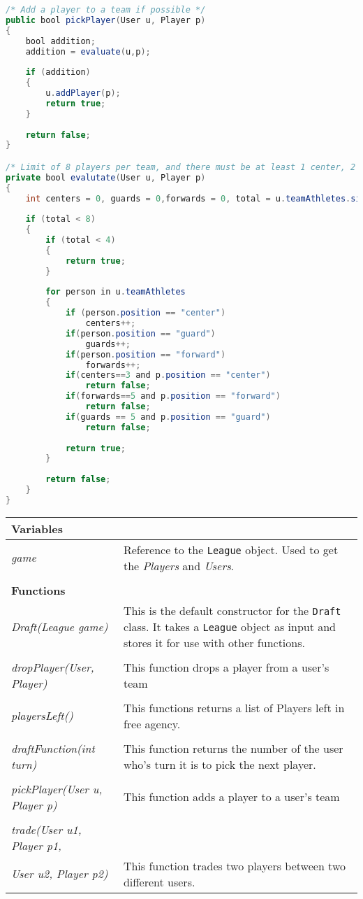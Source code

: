 \documentclass[12pt]{report}
\begin{document}
\begin{lstlisting}[language=Java,label=some-code,caption=Picking a Player]
/* Add a player to a team if possible */
public bool pickPlayer(User u, Player p)
{
	bool addition;
	addition = evaluate(u,p);
	
	if (addition)
	{
		u.addPlayer(p);
		return true;
	}
	
	return false;
}

/* Limit of 8 players per team, and there must be at least 1 center, 2 guards and 2 forwards per team. */
private bool evalutate(User u, Player p)
{
	int centers = 0, guards = 0,forwards = 0, total = u.teamAthletes.size();
	
	if (total < 8)
	{
		if (total < 4)
		{
			return true;
		}
		
		for person in u.teamAthletes
		{
			if (person.position == "center")
				centers++;
			if(person.position == "guard")
				guards++;
			if(person.position == "forward")
				forwards++;
			if(centers==3 and p.position == "center")
				return false;
			if(forwards==5 and p.position == "forward")
				return false;
			if(guards == 5 and p.position == "guard")
				return false;
				
			return true;
		}
		
		return false;
	}
}
\end{lstlisting}

\begin{flushleft}
\begin{onehalfspace}
\begin{tabular}[pos]{ l | p{10.5cm} }
\hline
\textbf{Variables} & \\
\hline
\textit{game} & Reference to the \texttt{League} object. Used to get the \textit{Players} and \textit{Users}. \\
\\
\hline
\textbf{Functions} & \\
\hline
\textit{Draft(League game)} & This is the default constructor for the \texttt{Draft} class. It takes a \texttt{League} object as input and stores it for use with other functions. \\
\\
\textit{dropPlayer(User, Player)} & This function drops a player from a user's team \\
\\
\textit{playersLeft()} & This functions returns a list of Players left in free agency. \\
\\
\textit{draftFunction(int turn)} & This function returns the number of the user who's turn it is to pick the next player. \\
\\
\textit{pickPlayer(User u, Player p)} & This function adds a player to a user's team \\
\\
\textit{trade(User u1, Player p1,} \\ \textit{User u2, Player p2)} & This function trades two players between two different users.
\\
\hline
\end{tabular}
\end{onehalfspace}
\end{flushleft}
\end{document}
